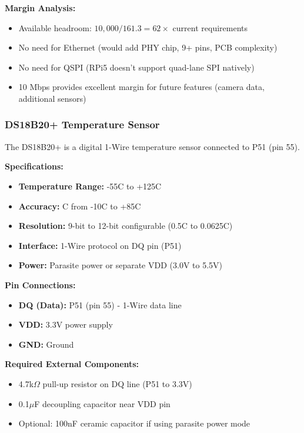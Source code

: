 \textbf{Margin Analysis:
}
\begin{itemize}
    \item Available headroom: $10,000 / 161.3 = 62\times$ current requirements
    \item No need for Ethernet (would add PHY chip, 9+ pins, PCB complexity)
    \item No need for QSPI (RPi5 doesn't support quad-lane SPI natively)
    \item 10 Mbps provides excellent margin for future features (camera data, additional sensors)
\end{itemize}

\subsubsection{DS18B20+ Temperature Sensor}

The DS18B20+ is a digital 1-Wire temperature sensor connected to P51 (pin 55).

\textbf{Specifications:}
\begin{itemize}
    \item \textbf{Temperature Range:} -55\textdegree C to +125\textdegree C
    \item \textbf{Accuracy:} \textdegree C from -10\textdegree C to +85\textdegree C
    \item \textbf{Resolution:} 9-bit to 12-bit configurable (0.5\textdegree C to 0.0625\textdegree C)
    \item \textbf{Interface:} 1-Wire protocol on DQ pin (P51)
    \item \textbf{Power:} Parasite power or separate VDD (3.0V to 5.5V)
\end{itemize}

\textbf{Pin Connections:}
\begin{itemize}
    \item \textbf{DQ (Data):} P51 (pin 55) - 1-Wire data line
    \item \textbf{VDD:} 3.3V power supply
    \item \textbf{GND:} Ground
\end{itemize}

\textbf{Required External Components:}
\begin{itemize}
    \item 4.7k$\Omega$ pull-up resistor on DQ line (P51 to 3.3V)
    \item 0.1$\mu$F decoupling capacitor near VDD pin
    \item Optional: 100nF ceramic capacitor if using parasite power mode
\end{itemize}


